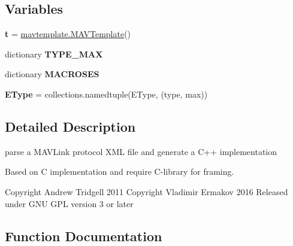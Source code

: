 \subsection*{Variables}
\begin{DoxyCompactItemize}
\item 
\mbox{\label{namespacepymavlink_1_1generator_1_1mavgen__cpp11_aa444dd03dd243c13577b102c36b91bd9}} 
{\bfseries t} = \hyperlink{classpymavlink_1_1generator_1_1mavtemplate_1_1MAVTemplate}{mavtemplate.\+M\+A\+V\+Template}()
\item 
dictionary {\bfseries T\+Y\+P\+E\+\_\+\+M\+AX}
\item 
dictionary {\bfseries M\+A\+C\+R\+O\+S\+ES}
\item 
\mbox{\label{namespacepymavlink_1_1generator_1_1mavgen__cpp11_ab1fba68cbea99714f526b45abbbbf86f}} 
{\bfseries E\+Type} = collections.\+namedtuple(\textquotesingle{}E\+Type\textquotesingle{}, (\textquotesingle{}type\textquotesingle{}, \textquotesingle{}max\textquotesingle{}))
\end{DoxyCompactItemize}


\subsection{Detailed Description}
\begin{DoxyVerb}parse a MAVLink protocol XML file and generate a C++ implementation

Based on C implementation and require C-library for framing.

Copyright Andrew Tridgell 2011
Copyright Vladimir Ermakov 2016
Released under GNU GPL version 3 or later
\end{DoxyVerb}
 

\subsection{Function Documentation}
\mbox{\label{namespacepymavlink_1_1generator_1_1mavgen__cpp11_a1780acf401220c5fc94513ec4e40fca4}} 
